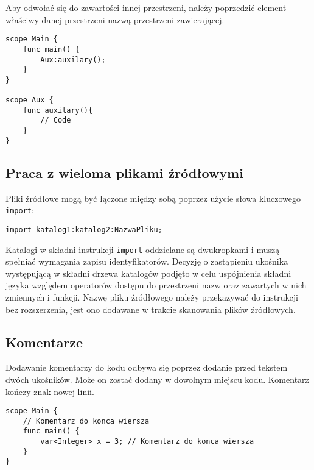 Aby odwołać się do zawartości innej przestrzeni, należy poprzedzić element właściwy danej przestrzeni nazwą przestrzeni zawierającej.
\begin{lstlisting}
scope Main {
	func main() {
		Aux:auxilary();	
	}
}

scope Aux {
	func auxilary(){
		// Code
	}
}
\end{lstlisting}

\subsection{Praca z wieloma plikami źródłowymi}
Pliki źródłowe mogą być łączone między sobą poprzez użycie słowa kluczowego \lstinline|import|:
\begin{lstlisting}
import katalog1:katalog2:NazwaPliku;
\end{lstlisting}
Katalogi w składni instrukcji \lstinline|import| oddzielane są dwukropkami i muszą spełniać wymagania zapisu identyfikatorów. Decyzję o zastąpieniu ukośnika występującą w składni drzewa katalogów podjęto w celu uspójnienia składni języka względem operatorów dostępu do przestrzeni nazw oraz zawartych w nich zmiennych i funkcji. Nazwę pliku źródłowego należy przekazywać do instrukcji bez rozszerzenia, jest ono dodawane w trakcie skanowania plików źródłowych. 

\subsection{Komentarze}
Dodawanie komentarzy do kodu odbywa się poprzez dodanie przed tekstem dwóch ukośników. Może on zostać dodany w dowolnym miejscu kodu. Komentarz kończy znak nowej linii.
\begin{lstlisting}
scope Main {
	// Komentarz do konca wiersza
	func main() {
		var<Integer> x = 3; // Komentarz do konca wiersza
	}
}
\end{lstlisting}


